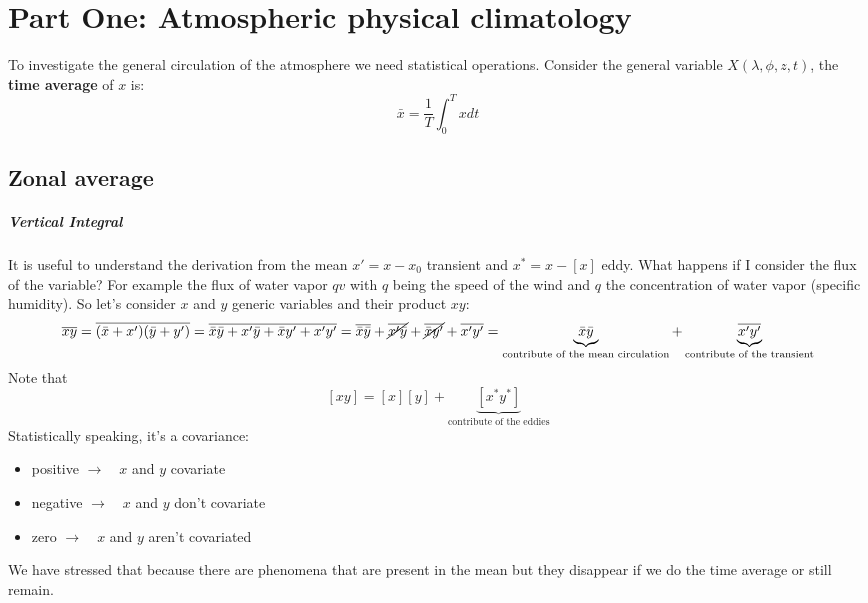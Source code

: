 \chapter{Part One: Atmospheric physical climatology}
To investigate the general circulation of the atmosphere we need statistical operations. Consider the general variable $X(\lambda, \phi,z,t)$, the \textbf{time average} of $x$ is:
\begin{equation}\label{eq.time eq}
    \bar{x}=\frac{1}{T}\int_0^Txdt
\end{equation}
\begin{figure}[!ht]
\centering



\label{fig:my_label}
\end{figure}

\section{Zonal average}

\paragraph{Vertical Integral}
It is useful to understand the derivation from the mean $x'=x-x_0$ transient and $x^*=x-[x]$ eddy. What happens if I consider the flux of the variable? For example the flux of water vapor $qv$ with $q$ being the speed of the wind and $q$ the concentration of water vapor (specific humidity). So let's consider $x$ and $y$ generic variables and their product $xy$:
$$\overline{xy}=\overline{(\bar{x}+x')(\bar{y}+y')}=\overline{\bar{x}\bar{y}+x'\bar{y}+\bar{x}y'+x'y'}=\overline{\bar{x}\bar{y}}+\cancel{\overline{x'\bar{y}}}+\cancel{\overline{\bar{x}y'}}+\overline{x'y'}=\underbrace{\bar{x}\bar{y}}_{\text{contribute of the mean circulation}}+\underbrace{\overline{x'y'}}_{\text{contribute of the transient}}$$
Note that $$[xy]=[x][y]+\underbrace{[x^*y^*]}_\text{contribute of the eddies}$$
Statistically speaking, it's a covariance:
\begin{itemize}
    \item positive $\rightarrow \quad x$ and $y$  covariate
    \item negative $\rightarrow \quad x$ and $y$ don't covariate
    \item zero $\rightarrow \quad x$ and $y$ aren't covariated
\end{itemize}
We have stressed that because there are phenomena that are present in the mean but they disappear if we do the time average or still remain. 

